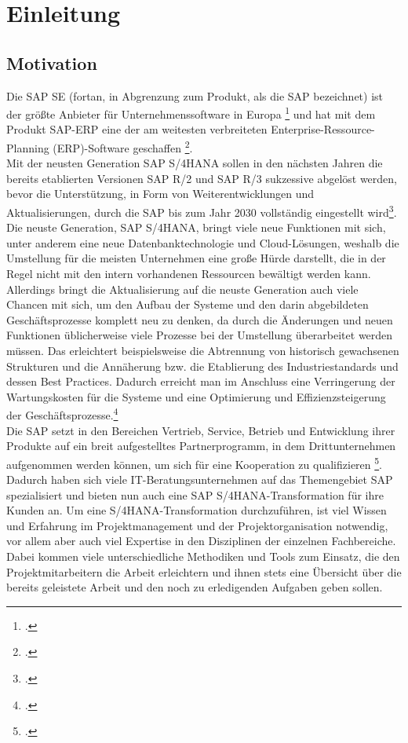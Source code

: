 \section{Einleitung}
\subsection{Motivation}
Die SAP SE (fortan, in Abgrenzung zum Produkt, als \glqq{}die\grqq{} SAP bezeichnet) ist der größte Anbieter für Unternehmenssoftware in Europa \footcite{sap-about} und hat mit dem Produkt SAP-ERP eine der am weitesten verbreiteten Enterprise-Ressource-Planning (ERP)-Software geschaffen \footcite{}. \\Mit der neusten Generation SAP S/4HANA sollen in den nächsten Jahren die bereits etablierten Versionen SAP R/2 und SAP R/3 sukzessive abgelöst werden, bevor die Unterstützung, in Form von Weiterentwicklungen und Aktualisierungen, durch die SAP bis zum Jahr 2030 vollständig eingestellt wird\footcite{sap-support}. Die neuste Generation, SAP S/4HANA, bringt viele neue Funktionen mit sich, unter anderem eine neue Datenbanktechnologie und Cloud-Lösungen, weshalb die Umstellung für die meisten Unternehmen eine große Hürde darstellt, die in der Regel nicht mit den intern vorhandenen Ressourcen bewältigt werden kann. Allerdings bringt die Aktualisierung auf die neuste Generation auch viele Chancen mit sich, um den Aufbau der Systeme und den darin abgebildeten Geschäftsprozesse komplett neu zu denken, da durch die Änderungen und neuen Funktionen üblicherweise viele Prozesse bei der Umstellung überarbeitet werden müssen. Das erleichtert beispielsweise die Abtrennung von historisch gewachsenen Strukturen und die Annäherung bzw. die Etablierung des Industriestandards und dessen Best Practices. Dadurch erreicht man im Anschluss eine Verringerung der Wartungskosten für die Systeme und eine Optimierung und Effizienzsteigerung der Geschäftsprozesse.\footcite{}\\ 
Die SAP setzt in den Bereichen Vertrieb, Service, Betrieb und  Entwicklung ihrer Produkte auf ein breit aufgestelltes Partnerprogramm, in dem Drittunternehmen aufgenommen werden können, um sich für eine Kooperation zu qualifizieren \footcite{sap-partner}. Dadurch haben sich viele IT-Beratungsunternehmen auf das Themengebiet SAP spezialisiert und bieten nun auch eine SAP S/4HANA-Transformation für ihre Kunden an. Um eine S/4HANA-Transformation durchzuführen, ist viel Wissen und Erfahrung im Projektmanagement und der Projektorganisation notwendig, vor allem aber auch viel Expertise in den Disziplinen der einzelnen Fachbereiche. Dabei kommen viele unterschiedliche Methodiken und Tools zum Einsatz, die den Projektmitarbeitern die Arbeit erleichtern und ihnen stets eine Übersicht über die bereits geleistete Arbeit und den noch zu erledigenden Aufgaben geben sollen. 

